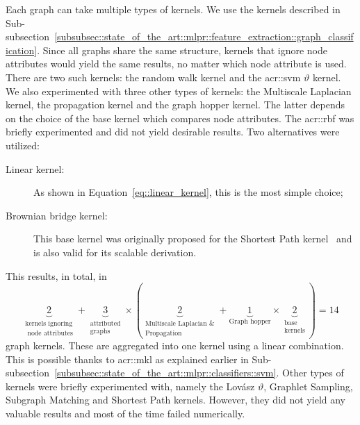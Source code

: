        Each graph can take multiple types of kernels.
        We use the kernels described in Sub-subsection~\ref{subsubsec::state_of_the_art::mlpr::feature_extraction::graph_classification}.
        Since all graphs share the same structure, kernels that ignore node attributes would yield the same results, no matter which node attribute is used.
        There are two such kernels: the random walk kernel and the \gls{acr::svm} \(\vartheta\) kernel.
        We also experimented with three other types of kernels: the Multiscale Laplacian kernel, the propagation kernel and the graph hopper kernel.
        The latter depends on the choice of the base kernel which compares node attributes.
        The \gls{acr::rbf} was briefly experimented and did not yield desirable results.
        Two alternatives were utilized:
        \begin{description}
            \item[Linear kernel:] As shown in Equation~\ref{eq::linear_kernel}, this is the most simple choice;
            \item[Brownian bridge kernel:] This base kernel was originally proposed for the Shortest Path kernel~\parencite{borgwardt2005shortest} and is also valid for its scalable derivation.
        \end{description}
        This results, in total, in \begin{equation*}
            \underbrace{2}_{\substack{\text{kernels ignoring}\\\text{ node attributes}}} + \underbrace{3}_{\substack{\text{attributed}\\\text{graphs}}} \times \left(\underbrace{2}_{\substack{\text{Multiscale Laplacian \&}\\\text{Propagation}}} + \underbrace{1}_{\text{Graph hopper}} \times \underbrace{2}_{\substack{\text{base}\\\text{kernels}}}\right) = 14
        \end{equation*} graph kernels.
        These are aggregated into one kernel using a linear combination.
        This is possible thanks to \gls{acr::mkl} as explained earlier in Sub-subsection~\ref{subsubsec::state_of_the_art::mlpr::classifiers::svm}.
        Other types of kernels were briefly experimented with, namely the Lov\'asz \(\vartheta\), Graphlet Sampling, Subgraph Matching and Shortest Path kernels.
        However, they did not yield any valuable results and most of the time failed numerically.
        
